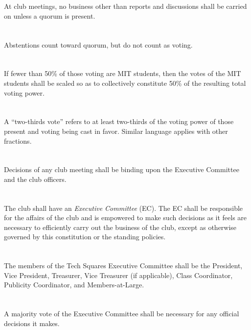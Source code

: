 \documentclass{bylaws}
\begin{document}
\section{}At club meetings, no business other than reports and discussions shall be carried on unless a quorum is present.
\section{}Abstentions count toward quorum, but do not count as voting.
\section{}If fewer than 50\% of those voting are MIT students, then the votes of the MIT students shall be scaled so as to collectively constitute 50\% of the resulting total voting power.
\section{}A ``two-thirds vote'' refers to at least two-thirds of the voting power of those present and voting being cast in favor. Similar language applies with other fractions.
\section{}Decisions of any club meeting shall be binding upon the Executive Committee
and the club officers.


\section{}The club shall have an \textit{Executive Committee} (EC). The EC shall be responsible for the affairs of the club and is empowered to make such decisions as it feels are necessary to efficiently carry out the business of the club, except as otherwise governed by this constitution or the standing policies.
\section{}The members of the Tech Squares Executive Committee shall be the President, Vice President, Treasurer, Vice Treasurer (if applicable), Class Coordinator, Publicity Coordinator, and Members-at-Large.
\section{}A majority vote of the Executive Committee shall be necessary for any official decisions it makes.
\end{document}

